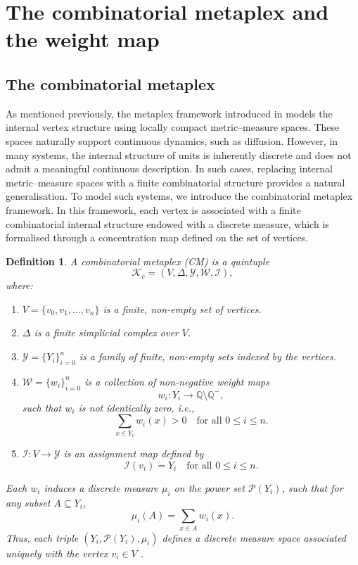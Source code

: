 \documentclass[12pt]{article}
\theoremstyle{normalhead_nobrackets}
\newtheorem{definition}{Definition}[section]
\theoremstyle{exampstyle}
\begin{document}
\section{The combinatorial metaplex and the weight map}\label{1sec:CM framework}

\subsection{The combinatorial metaplex}

\bigskip

As mentioned previously, the metaplex framework introduced in \cite{estrada2020metaplex} models the internal vertex structure using locally compact metric–measure spaces. These spaces naturally support continuous dynamics, such as diffusion. However, in many systems, the internal structure of units is inherently discrete and does not admit a meaningful continuous description. In such cases, replacing internal metric–measure spaces with a finite combinatorial structure provides a natural generalisation. To model such systems, we introduce the combinatorial metaplex framework. In this framework, each vertex is associated with a finite combinatorial internal structure endowed with a discrete measure, which is formalised through a concentration map defined on the set of vertices.
\begin{definition}
A combinatorial metaplex (CM) is a quintuple
\begin{equation}\label{1eq:CM}
     \mathcal{K}_c = (V, \Delta, \mathcal{Y}, \mathcal{W}, \mathcal{I}),
\end{equation}
where:
\begin{enumerate}
     \item[(i)] $V = \{v_0, v_1, \dots, v_n\}$ is a finite, non-empty set of vertices.
     \item[(ii)] $\Delta$ is a finite simplicial complex over $V$.
     \item[(iii)] $\mathcal{Y} = \{Y_i\}_{i=0}^n$ is a family of finite, non-empty sets indexed by the vertices.
     \item[(iv)] $\mathcal{W} = \{w_i\}_{i=0}^n$ is a collection of non-negative weight maps
     \[
     w_i : Y_i \to \mathbb{Q} \setminus \mathbb{Q}^-,
     \]
     such that $w_i$ is not identically zero, i.e.,
     \[
         \sum_{x \in Y_i} w_i(x) > 0 \quad \text{for all } 0 \le i \le n.
     \]
    
    \item[(v)] $\mathcal{I} : V \to \mathcal{Y}$ is an assignment map defined by
    \[
        \mathcal{I}(v_i) = Y_i \quad \text{for all } 0 \le i \le n.
    \]
\end{enumerate}

Each $w_i$ induces a discrete measure $\mu_i$ on the power set $\mathcal{P}(Y_i)$, such that for any subset $A \subseteq Y_i$,
\begin{equation*}
    \mu_i(A) = \sum_{x \in A} w_i(x).
\end{equation*}
Thus, each triple $(Y_i, \mathcal{P}(Y_i), \mu_i)$ defines a discrete measure space associated uniquely with the vertex $v_i \in V$ \cite{rudin1987real}.
\end{definition}
\end{document}
